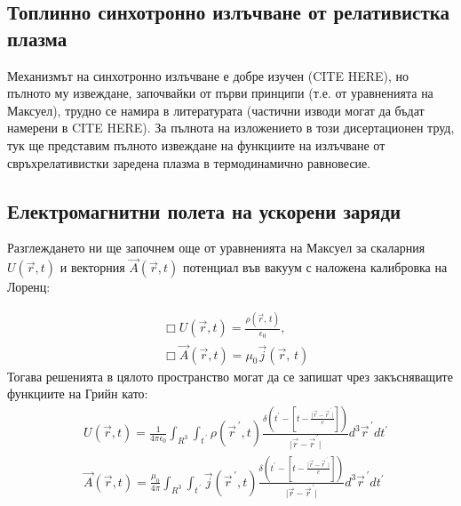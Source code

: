 \appendixpage
\begin{appendices}
	\section{Топлинно синхотронно излъчване от релативистка плазма}
	
	Механизмът на синхотронно излъчване е добре изучен (CITE HERE), но пълното му извеждане, започвайки от първи принципи (т.е. от уравненията на Максуел), трудно се намира в литературата (частични изводи могат да бъдат намерени в CITE HERE). За пълнота на изложението в този дисертационен труд, тук ще представим пълното извеждане на функциите на излъчване от свръхрелативистки заредена плазма в термодинамично равновесие.
	
	\subsection{Електромагнитни полета на ускорени заряди}
	
	Разглеждането ни ще започнем още от уравненията на Максуел за скаларния $U\left(\vec{r},t\right)$ и векторния $\vec{A}\left(\vec{r},t\right)$ потенциал във вакуум с наложена калибровка на Лоренц:
	
	\begin{equation}
		\begin{split}
		&\Box U\left(\vec{r},t\right) = \frac{\rho(\vec{r},\,t)}{\epsilon_0},\\
	    &\Box \vec{A}\left(\vec{r},t\right) = \mu_0\vec{j}(\vec{r},\,t)
		\end{split}
	\end{equation}
	Тогава решенията в цялото пространство могат да се запишат чрез закъсняващите функциите на Грийн като:
	\begin{equation}
		\begin{split}
			&U\left(\vec{r},t\right) = \frac{1}{4\pi\epsilon_0}\int_{R^3}\int_{t^{\,\prime}} \rho(\vec{r}^{\,\prime},t)\frac{\delta\left(t^\prime - \left[t - \frac{\vert \vec{r} - \vec{r}^{\,\prime}\vert}{c}\right]\right)}{\vert \vec{r} - \vec{r}^{\,\prime}\vert}d^3\vec{r}^{\,\prime} dt^\prime\\
			&\vec{A}\left(\vec{r},t\right) = \frac{\mu_0}{4\pi}\int_{R^3}\int_{t^{\,\prime}} \vec{j}(\vec{r}^{\,\prime},t)\frac{\delta\left(t^\prime - \left[t - \frac{\vert \vec{r} - \vec{r}^{\,\prime}\vert}{c}\right]\right)}{\vert \vec{r} - \vec{r}^{\,\prime}\vert}d^3\vec{r}^{\,\prime} dt^\prime		
		\end{split}
	\end{equation} 
	

\end{appendices}
